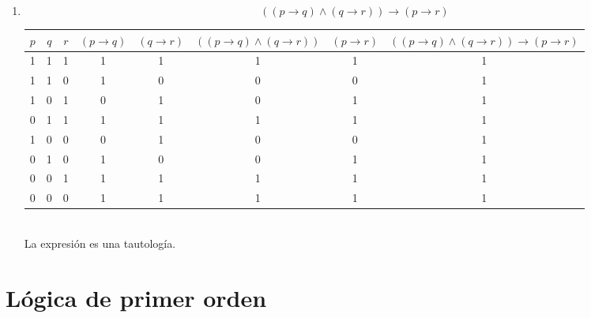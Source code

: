\documentclass[11pt]{utalcaDoc}
\begin{document}
\begin{enumerate}
\item
\[ ((p \to q) \wedge (q \to r)) \to (p \to r)\]
\begin{tabular}{|c|c|c||c|c|c|c|c|}
\hline
$p$ & $q$ & $r$ & $(p \to q)$ & $(q \to r)$ & $((p \to q) \wedge (q \to r))$ & $(p \to r)$ & $((p \to q) \wedge (q \to r)) \to (p \to r)$ \\
\hline 
1 & 1 & 1 & 1 & 1 & 1 & 1 & 1 \\ 
\hline 
1 & 1 & 0 & 1 & 0 & 0 & 0 & 1 \\ 
\hline 
1 & 0 & 1 & 0 & 1 & 0 & 1 & 1 \\ 
\hline 
0 & 1 & 1 & 1 & 1 & 1 & 1 & 1 \\ 
\hline 
1 & 0 & 0 & 0 & 1 & 0 & 0 & 1 \\ 
\hline 
0 & 1 & 0 & 1 & 0 & 0 & 1 & 1 \\ 
\hline 
0 & 0 & 1 & 1 & 1 & 1 & 1 & 1 \\ 
\hline 
0 & 0 & 0 & 1 & 1 & 1 & 1 & 1 \\ 
\hline 
\end{tabular} \\ 
La expresión es una tautología.



\end{enumerate}
\newpage
\subsection{ } %

\newpage
\section{Lógica de primer orden}


\subsection{ } %

\newpage
\subsection{ } %
 
\newpage
\subsection{ } %
\end{document}
